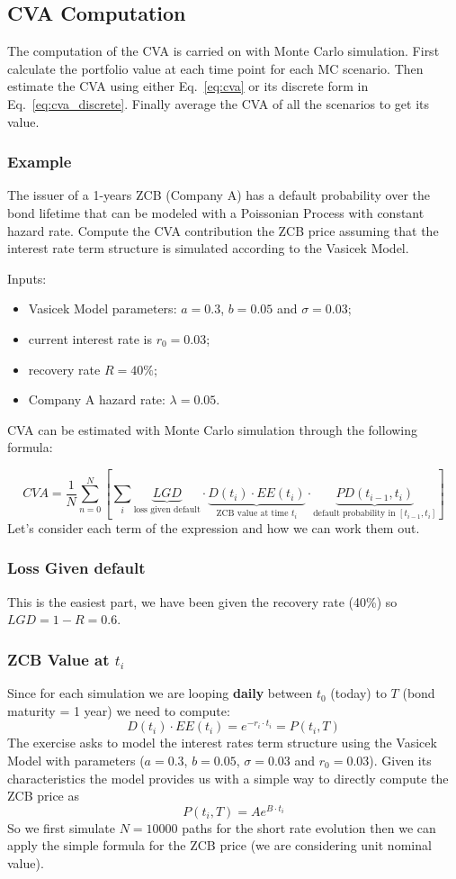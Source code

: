 \subsection{CVA Computation}

The computation of the CVA is carried on with Monte Carlo simulation. 
First calculate the portfolio value at each time point for each MC scenario. Then estimate the CVA using either Eq.~\ref{eq:cva} or its discrete form in Eq.~\ref{eq:cva_discrete}. Finally average the CVA of all the scenarios to get its value.

\subsubsection{Example}
The issuer of a 1-years ZCB (Company A) has a default probability over the bond lifetime that can be modeled with a Poissonian Process with constant hazard rate. Compute the CVA contribution the ZCB price assuming that the interest rate term structure is simulated according to the Vasicek Model.

Inputs:
\begin{itemize}
\item Vasicek Model parameters: $a=0.3$, $b=0.05$ and $\sigma=0.03$;
\item current interest rate is $r_0 =0.03$;
\item recovery rate $R = 40\%$;
\item Company A hazard rate: $\lambda = 0.05$.
\end{itemize}

CVA can be estimated with Monte Carlo simulation through the following formula:

$$
CVA = \frac{1}{N}\sum_{n=0}^N \left[\sum_i \underbrace{LGD}_{\text{loss given default}} \cdot \underbrace{D(t_i)\cdot EE(t_i)}_{\text{ZCB value at time }t_i}\cdot \underbrace{PD(t_{i-1}, t_i)}_{\text{default probability in }[t_{i-1},t_i]}\right]
$$
Let's consider each term of the expression and how we can work them out.
\subsubsection{Loss Given default}
This is the easiest part, we have been given the recovery rate (40\%) so $LGD = 1 - R = 0.6$.

\subsubsection{ZCB Value at $t_i$}
Since for each simulation we are looping \textbf{daily} between $t_0$ (today) to $T$ (bond maturity = 1 year) we need to compute:
$$
D(t_i)\cdot EE(t_i) = e^{-r_i\cdot t_i} = P(t_i, T)
$$
The exercise asks to model the interest rates term structure using the Vasicek Model with parameters ($a=0.3$, $b=0.05$, $\sigma=0.03$ and $r_0 =0.03$).
Given its characteristics the model provides us with a simple way to directly compute the ZCB price as
$$
P(t_i, T) = A e^{B\cdot t_i}
$$
So we first simulate $N=10000$ paths for the short rate evolution then we can apply the simple formula for the ZCB price (we are considering unit nominal value).

